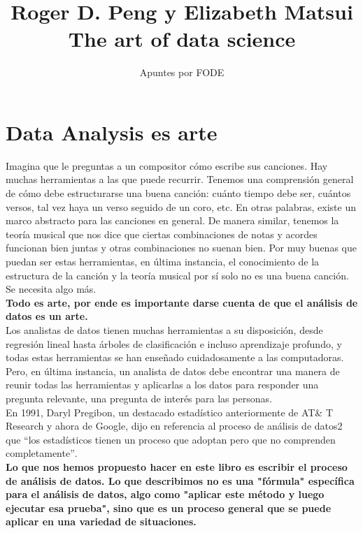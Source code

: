 \documentclass[10pt]{book}
\begin{document}
\normalfont

\author{\Large Apuntes por FODE}
\title{\small Roger D. Peng y Elizabeth Matsui \\ \vspace{1cm} \large The art of data science}
\date{}
\pagestyle{empty}
\maketitle
\thispagestyle{empty}
\let\cleardoublepage\clearpage
\tableofcontents								%


 
\let\cleardoublepage\clearpage
\chapter{Data Analysis es arte}
Imagina que le preguntas a un compositor cómo escribe sus canciones. Hay muchas herramientas a las que puede recurrir. Tenemos una comprensión general de cómo debe estructurarse una buena canción: cuánto tiempo debe ser, cuántos versos, tal vez haya un verso seguido de un coro, etc. En otras palabras, existe un marco abstracto para las canciones en general. De manera similar, tenemos la teoría musical que nos dice que ciertas combinaciones de notas y acordes funcionan bien juntas y otras combinaciones no suenan bien. Por muy buenas que puedan ser estas herramientas, en última instancia, el conocimiento de la estructura de la canción y la teoría musical por sí solo no es una buena canción. Se necesita algo más.\\
\textbf{Todo es arte, por ende es importante darse cuenta de que el análisis de datos es un arte.}\\
Los analistas de datos tienen muchas herramientas a su disposición, desde regresión lineal hasta árboles de clasificación e incluso aprendizaje profundo, y todas estas herramientas se han enseñado cuidadosamente a las computadoras. Pero, en última instancia, un analista de datos debe encontrar una manera de reunir todas las herramientas y aplicarlas a los datos para responder una pregunta relevante, una pregunta de interés para las personas.\\
En 1991, Daryl Pregibon, un destacado estadístico anteriormente de AT\& T Research y ahora de Google, dijo en referencia al proceso de análisis de datos2 que $“$los estadísticos tienen un proceso que adoptan pero que no comprenden completamente$”$.\\
\textbf{Lo que nos hemos propuesto hacer en este libro es escribir el proceso de análisis de datos. Lo que describimos no es una "fórmula" específica para el análisis de datos, algo como "aplicar este método y luego ejecutar esa prueba", sino que es un proceso general que se puede aplicar en una variedad de situaciones.}\\
\end{document}
